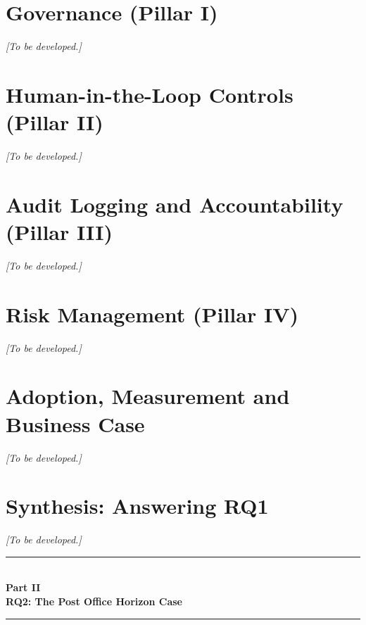 \documentclass[12pt,a4paper]{article}
\begin{document}
\section{Governance (Pillar I)}
\label{sec:governance}
\textit{[To be developed.]}

\section{Human-in-the-Loop Controls (Pillar II)}
\label{sec:hitl}
\textit{[To be developed.]}

\section{Audit Logging and Accountability (Pillar III)}
\label{sec:audit}
\textit{[To be developed.]}

\section{Risk Management (Pillar IV)}
\label{sec:risk}
\textit{[To be developed.]}

\section{Adoption, Measurement and Business Case}
\label{sec:adoption}
\textit{[To be developed.]}

\section{Synthesis: Answering RQ1}
\label{sec:synthesis}
\textit{[To be developed.]}

\clearpage
\begin{center}
{\color{accentdark}\rule{\textwidth}{1.2pt}}\\[6pt]
{\Huge\bfseries\color{accentdark} Part II}\\[8pt]
{\LARGE\bfseries\color{accentdark!85!black} RQ2: The Post Office Horizon Case}\\[8pt]
{\color{accentdark}\rule{\textwidth}{1.2pt}}
\end{center}
\vspace{8pt}
\end{document}
